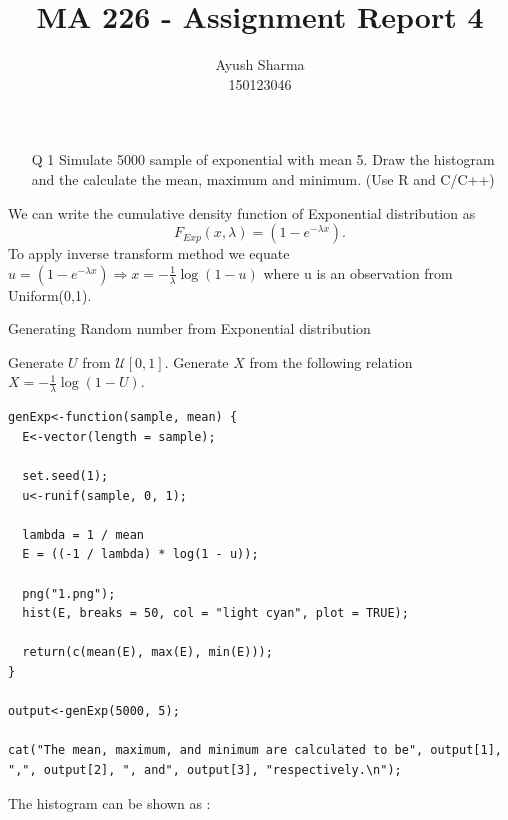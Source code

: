 \documentclass[11pt]{article}
\title{MA 226 - Assignment Report 4}
\author{Ayush Sharma\\150123046}
\begin{document}
\titlepage
\newpage

\begin{enumerate}
\item[Q 1]  Simulate 5000 sample of exponential with mean 5.
Draw the histogram and the calculate the mean, maximum and minimum.
(Use R and C/C++)
\end{enumerate}

  We can write the cumulative density function of Exponential distribution as
$$F_{Exp}(x, \lambda) = (1 - e^{-\lambda x}).$$
To apply inverse transform method we equate $u = (1 - e^{-\lambda x})  \Rightarrow   x = -\frac{1}{\lambda}\log(1 - u)$ where u is an observation from Uniform(0,1).

\begin{algorithm}[H]
\caption{Generating Random number from Exponential distribution}
\begin{algorithmic}[1]
\STATE Generate $U$ from $\mathcal{U}[0,1]$.
\STATE Generate $X$ from the following relation $X = -\frac{1}{\lambda}\log(1 - U)$.
\end{algorithmic}
\end{algorithm}


\begin{lstlisting}
genExp<-function(sample, mean) {
  E<-vector(length = sample);

  set.seed(1);
  u<-runif(sample, 0, 1);

  lambda = 1 / mean
  E = ((-1 / lambda) * log(1 - u));

  png("1.png");
  hist(E, breaks = 50, col = "light cyan", plot = TRUE);

  return(c(mean(E), max(E), min(E)));
}

output<-genExp(5000, 5);

cat("The mean, maximum, and minimum are calculated to be", output[1], ",", output[2], ", and", output[3], "respectively.\n");

\end{lstlisting}
\newpage
{}

The histogram can be shown as :
\end{document}
